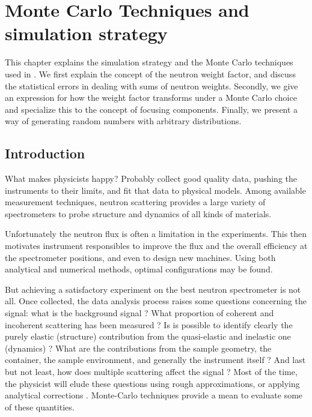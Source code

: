 
\chapter{Monte Carlo Techniques and simulation strategy}
\label{s:MCtechniques}

This chapter explains the simulation strategy and the Monte Carlo
techniques used in \MCS. We first explain the concept of the neutron
weight factor, and discuss the statistical errors in dealing with sums
of neutron weights.  Secondly, we give an expression for how the weight
factor transforms under a Monte Carlo choice and specialize this
to the concept of focusing components.  Finally, we present a way of
generating random numbers with arbitrary distributions.

\section{Introduction}
What makes physicists happy? Probably collect good quality data, pushing the instruments to their limits, and fit that data to physical models.
Among available measurement techniques, neutron scattering provides a large variety of spectrometers to probe structure and dynamics of all kinds of materials.

Unfortunately the neutron flux is often a limitation in the experiments. This then motivates instrument responsibles to improve the flux and the overall efficiency at the spectrometer positions, and even to design new machines. Using both analytical and numerical methods, optimal configurations may be found.

But achieving a satisfactory experiment on the best neutron spectrometer is not all. Once collected, the data analysis process raises some questions concerning the signal: what is the background signal ? What proportion of coherent and incoherent scattering has been measured ? Is is possible to identify clearly the purely elastic (structure) contribution from the quasi-elastic and inelastic one (dynamics) ? What are the contributions from the sample geometry, the container, the sample environment, and generally the instrument itself ? And last but not least, how does multiple scattering affect the signal ? Most of the time, the physicist will elude these questions using rough approximations, or applying analytical corrections \cite{Copley86}. Monte-Carlo techniques provide a mean to evaluate some of these quantities.

